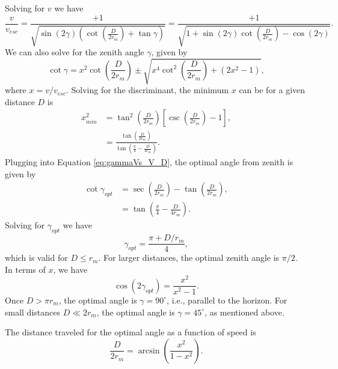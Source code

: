 \documentclass{hitec}
\numberwithin{equation}{section}
\begin{document}
Solving for $v$ we have
\begin{equation}\label{eq:speed_asof_distance_angle}
\frac{v}{v_{esc}} = \frac{+1}{\sqrt{\sin(2\gamma)\left(\cot\left(\frac{D}{2r_m}\right)+\tan\gamma\right)}}
= \frac{+1}{\sqrt{1+\sin(2\gamma)\cot\left(\frac{D}{2r_m}\right)-\cos(2\gamma)}}.
\end{equation}
We can also solve for the zenith angle $\gamma$, given by
\begin{equation}\label{eq:gammaVs_V_D}
\cot\gamma = x^2\cot\left(\frac{D}{2r_m}\right) \pm \sqrt{x^4\cot^2\left(\frac{D}{2r_m}\right) + (2x^2-1)},
\end{equation}
where $x = v/v_{esc}$. Solving for the discriminant, the minimum $x$ can be for a given distance $D$ is
\begin{align}
x_{min}^2 &= \tan^2\left(\frac{D}{2r_m}\right)\left[\csc\left(\frac{D}{2r_m}\right)-1\right],\\\label{eq:v_min_tans}
&=\frac{\tan\left(\frac{D}{2r_m}\right)}{\tan\left(\frac{\pi}{4}-\frac{D}{4r_m}\right)}.
\end{align}
Plugging into Equation \ref{eq:gammaVs_V_D}, the optimal angle from zenith is given by
\begin{align}\label{eq:opt_angle}
\cot\gamma_{opt} &= \sec\left(\frac{D}{2r_m}\right) - \tan\left(\frac{D}{2r_m}\right),\\\nonumber
&=\tan\left(\frac{\pi}{4}-\frac{D}{4r_m}\right).
\end{align}
Solving for $\gamma_{opt}$ we have
\begin{equation}
\gamma_{opt} = \frac{\pi+D/r_m}{4},
\end{equation}
which is valid for $D \le r_m$. For larger distances, the optimal zenith angle is $\pi/2$.
In terms of $x$, we have
\begin{equation}\label{eq:opt_angle_speed}
\cos(2\gamma_{opt}) = \frac{x^2}{x^2-1}.
\end{equation}
Once $D > \pi r_m$, the optimal angle is $\gamma = 90^\circ$, i.e., parallel to the horizon. For small distances $D \ll 2r_m$, the optimal angle is $\gamma = 45^\circ$, as mentioned above.

The distance traveled for the optimal angle as a function of speed is
\begin{equation}
\frac{D}{2r_m} = \arcsin\left(\frac{x^2}{1-x^2}\right).
\end{equation}
\end{document}

